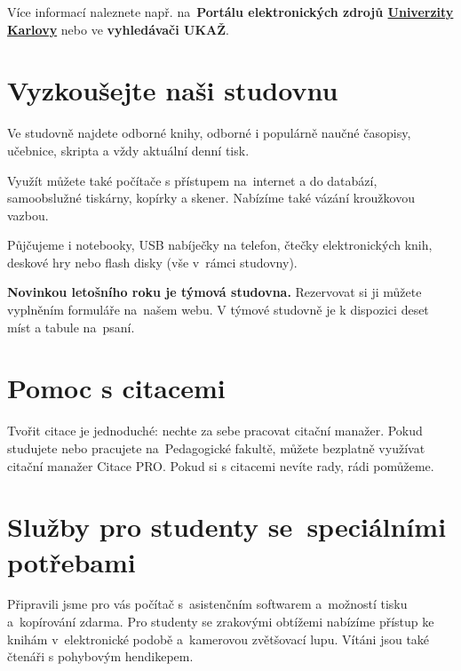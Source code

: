 Více informací naleznete např. na~\textbf{Portálu elektronických zdrojů
  {\href{http://pez.cuni.cz}{Univerzity Karlovy}}} nebo ve \textbf{vyhledávači UKAŽ}.




\ikonka{\faGraduationCap}
\section{Vyzkoušejte naši studovnu}

Ve studovně najdete odborné knihy, odborné i populárně naučné
časopisy, učebnice, skripta a vždy aktuální denní tisk.

Využít můžete také počítače s přístupem na~internet a do databází,
samoobslužné tiskárny, kopírky a skener. Nabízíme také vázání kroužkovou vazbou.

Půjčujeme i notebooky, USB nabíječky na
telefon, čtečky elektronických knih, deskové hry nebo flash disky (vše
v~rámci studovny).

\textbf{Novinkou letošního roku je týmová studovna.} Rezervovat si ji můžete
vyplněním formuláře na~našem webu. V týmové studovně je k dispozici deset míst
a tabule na~psaní.




\ikonka{\faAndroid}
\section{Pomoc s citacemi}

Tvořit citace je jednoduché: nechte za sebe pracovat citační manažer.
Pokud studujete nebo pracujete na~Pedagogické fakultě,
můžete bezplatně využívat citační manažer Citace PRO.
Pokud si s citacemi nevíte rady, rádi pomůžeme.

\bigskip
\ikonka{\faHeart}
\section{Služby pro studenty se~speciálními potřebami}

Připravili jsme pro vás počítač s~asistenčním softwarem
a~možností tisku a~kopírování zdarma. Pro studenty se zrakovými obtížemi
nabízíme přístup ke knihám v~elektronické podobě a~kamerovou
zvětšovací lupu. 
Vítáni jsou také čtenáři s pohybovým hendikepem.  
\newpage
